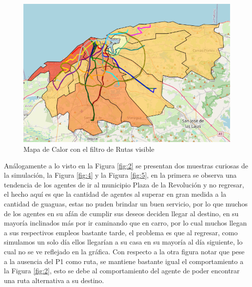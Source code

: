 \documentclass[a4paper,12pt]{article}
\begin{document}
\begin{figure}[H]
    \centering
    \includegraphics[width=1\textwidth]{imgs/mc.png}
    \caption{Mapa de Calor con el filtro de Rutas visible}
    \label{fig:3}
\end{figure}

An\'alogamente a lo visto en la Figura \ref{fig:2} se presentan dos muestras curiosas de la simulaci\'on, la Figura \ref{fig:4} y la Figura \ref{fig:5}, en la primera se observa una tendencia de los agentes de ir al municipio Plaza de la Revoluci\'on y no regresar, el hecho aqu\'i es que la cantidad de agentes al superar en gran medida a la cantidad de guaguas, estas no puden brindar un buen servicio, por lo que muchos de los agentes en su af\'an de cumplir sus deseos deciden llegar al destino, en su mayor\'ia inclinados m\'as por ir caminando que en carro, por lo cual muchos llegan a sus respectivos empleos bastante tarde, el problema es que al regresar, como simulamos un solo d\'ia ellos llegar\'ian a su casa en su mayor\'ia al d\'ia siguiente, lo cual no se ve reflejado en la gr\'afica. Con respecto a la otra figura notar que pese a la ausencia del P1 como ruta, se mantiene bastante igual el comportamiento a la Figura \ref{fig:2}, esto se debe al comportamiento del agente de poder encontrar una ruta alternativa a su destino.
\end{document}
